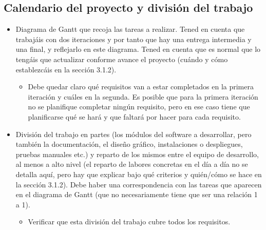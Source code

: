 \subsection{Calendario del proyecto y división del trabajo}
\begin{itemize}
	\item Diagrama de Gantt que recoja las tareas a realizar. Tened en cuenta que trabajáis con dos iteraciones y por tanto que hay una entrega intermedia y una final, y reflejarlo en este diagrama. Tened en cuenta que es normal que lo tengáis que actualizar conforme avance el proyecto (cuándo y cómo establezcáis en la sección 3.1.2).
	\begin{itemize}
		\item Debe quedar claro qué requisitos van a estar completados en la primera iteración y cuáles en la segunda. Es posible que para la primera iteración no se planifique completar ningún requisito, pero en ese caso tiene que planificarse qué se hará y que faltará por hacer para cada requisito.
	\end{itemize}
	\item División del trabajo en partes (los módulos del software a desarrollar, pero también  la documentación, el diseño gráfico, instalaciones o despliegues, pruebas manuales etc.) y reparto de los mismos entre el equipo de desarrollo, al menos a alto nivel (el reparto de labores concretas en el día a día no se detalla aquí, pero hay que explicar bajo qué criterios y quién/cómo se hace en la sección 3.1.2). Debe haber una correspondencia con las tareas que aparecen en el diagrama de Gantt (que no necesariamente tiene que ser una relación 1 a 1).
	\begin{itemize}
		\item Verificar que esta división del trabajo cubre todos los requisitos.
	\end{itemize}
\end{itemize}
